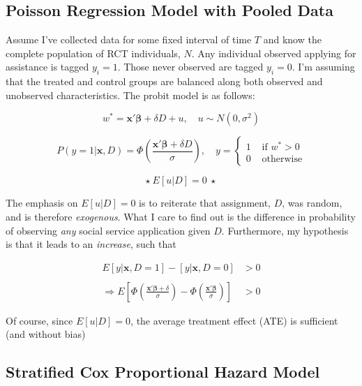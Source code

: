 \documentclass[12pt,letterpaperpaper,]{book}
\begin{document}
\subsection*{Poisson Regression Model with Pooled
Data}\label{poisson-regression-model-with-pooled-data}

Assume I've collected data for some fixed interval of time \(T\) and
know the complete population of RCT individuals, \(N\). Any individual
observed applying for assistance is tagged \(y_i=1\). Those never
observed are tagged \(y_i=0\). I'm assuming that the treated and control
groups are balanced along both observed and unobserved characteristics.
The probit model is as follows:

\[
w^* = \bm{x'\beta}  + \delta D + u, \quad u \sim N(0, \sigma^2)
\]

\[
P(y=1|\bm{x}, D) = \Phi \left (\frac{\bm{x'\beta}  + \delta D}{\sigma} \right ), \quad
y = \left \{
  \begin{array}{cc}
    1 & \text{ if } w^* > 0 \\
    0 & \text{ otherwise}
  \end{array}
  \right .
\]

\[
\star ~ E[u|D] = 0 ~ \star
\]

The emphasis on \(E[u|D] = 0\) is to reiterate that assignment, \(D\),
was random, and is therefore \emph{exogenous}. What I care to find out
is the difference in probability of observing \emph{any} social service
application given \(D\). Furthermore, my hypothesis is that it leads to
an \emph{increase}, such that

\[
\begin{aligned}
  E[y|\bm{x}, D=1] - [y|\bm{x}, D=0] &> 0 \\
  \\
  \Rightarrow E \left [
        \Phi \left (\frac{\bm{x'\beta}  + \delta}{\sigma} \right )
      -
        \Phi \left (\frac{\bm{x'\beta}}{\sigma} \right )
     \right ]  &> 0
\end{aligned}
\]

Of course, since \(E[u|D] = 0\), the average treatment effect (ATE) is
sufficient (and without bias)

\subsection*{Stratified Cox Proportional Hazard
Model}\label{stratified-cox-proportional-hazard-model}
\end{document}
